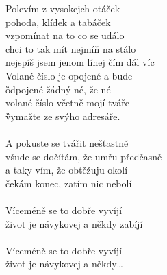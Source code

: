 \begin{multicols}{2}
\FisMi Polevím z vysokejch \Ha otáček\\
\EmajSedm pohoda, klídek a \CisMi tabáček\\
\FisMi vzpomínat na to co se \Ha událo\\
\EmajSedm chci to tak mít nejmíň na \CisMi stálo\\
\FisMi nejspíš jsem jenom \Ha línej čím dál \E víc\\

\D Volané číslo je opojené a bude\\ 
\G odpojené žádný \A né, že né\\
\D volané číslo včetně mojí tváře\\
\G vymažte ze svýho \A adresáře.\\
\\
\Emi A pokuste se tvářit \A nešťastně\\
všude se \DmajSedm dočítám, že umřu \Hmi předčasně\\
a taky \Emi vím, že obtěžuju \A okolí\\
čekám \DmajSedm konec, zatím nic \Hmi nebolí\\
\\
\Emi Víceméně se to dobře \A vyvíjí\\
život je \DmajSedm návykovej a někdy \Hmi zabíjí\\
\\
\Emi Víceméně se to dobře \A vyvíjí\\
život je \DmajSedm návykovej a někdy\ldots
\end{multicols}